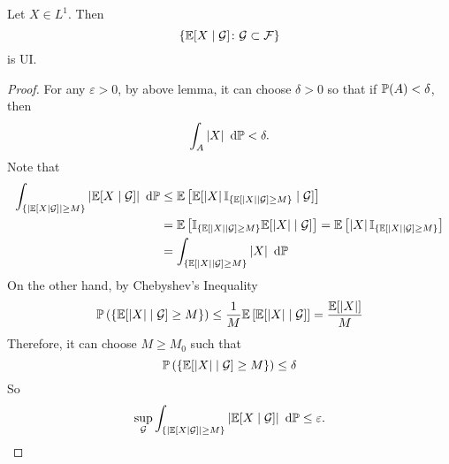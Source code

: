 \begin{exam}
    Let $X \in L^1$. Then
    \begin{equation*}
        \left\{\mathbb{E}[X \mid \mathcal{G}]\colon \mathcal{G} \subset \mathcal{F}\right\}
    \end{equation*}
    is UI.
    \begin{proof}
        For any $\varepsilon > 0$, by above lemma, it can choose $\delta > 0$ so that if $\mathbb{P}(A) < \delta$, then
        \begin{equation*}
            \int_A \left\lvert X\right\lvert ~\mathrm{d}\mathbb{P} < \delta.
        \end{equation*}
        Note that
        \begin{equation*}
            \begin{aligned}
                \int_{\left\{\left\lvert\mathbb{E}[X \mid \mathcal{G}]\right\lvert \geq M\right\}}\left\lvert\mathbb{E}[X \mid \mathcal{G}]\right\lvert ~\mathrm{d}\mathbb{P} & \leq \mathbb{E}\left[\mathbb{E}[\left\lvert X\right\lvert\mathbb{I}_{\left\{\mathbb{E}[\left\lvert X\right\lvert \mid \mathcal{G}] \geq M\right\}} \mid \mathcal{G}]\right] \\
                &= \mathbb{E}\left[\mathbb{I}_{\left\{\mathbb{E}[\left\lvert X\right\lvert \mid \mathcal{G}] \geq M\right\}}\mathbb{E}[\left\lvert X\right\lvert \mid \mathcal{G}]\right] = \mathbb{E}\left[\left\lvert X\right\lvert\mathbb{I}_{\left\{\mathbb{E}[\left\lvert X\right\lvert \mid \mathcal{G}] \geq M\right\}}\right] \\
                &= \int_{\left\{\mathbb{E}[\left\lvert X\right\lvert \mid \mathcal{G}] \geq M\right\}} \left\lvert X\right\lvert~\mathrm{d}\mathbb{P}
            \end{aligned}
        \end{equation*}
        On the other hand, by Chebyshev's Inequality
        \begin{equation*}
            \mathbb{P}\left(\left\{\mathbb{E}[\left\lvert X\right\lvert \mid \mathcal{G}] \geq M\right\}\right) \leq \frac{1}{M} \mathbb{E}\left[\mathbb{E}[\left\lvert X\right\lvert \mid \mathcal{G}]\right] = \frac{\mathbb{E}[\left\lvert X\right\lvert]}{M}
        \end{equation*}
        Therefore, it can choose $M \geq M_0$ such that
        \begin{equation*}
            \mathbb{P}\left(\left\{\mathbb{E}[\left\lvert X\right\lvert \mid \mathcal{G}] \geq M\right\}\right) \leq \delta
        \end{equation*}
        So
        \begin{equation*}
            \sup_{\mathcal{G}} \int_{\left\{\left\lvert\mathbb{E}[X \mid \mathcal{G}]\right\lvert \geq M\right\}}\left\lvert\mathbb{E}[X \mid \mathcal{G}]\right\lvert ~\mathrm{d}\mathbb{P} \leq \varepsilon. \qedhere
        \end{equation*}
    \end{proof}
\end{exam}

